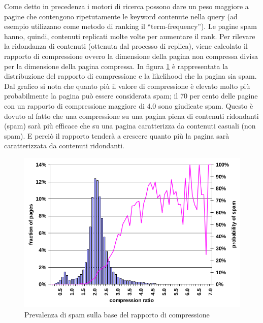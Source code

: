 Come detto in precedenza i  motori di ricerca possono dare un peso maggiore a pagine che contengono ripetutamente le keyword contenute nella query (ad esempio utilizzano come metodo di ranking il ``term-frequency''). Le pagine spam hanno, quindi,  contenuti replicati molte volte per aumentare il rank. Per rilevare la ridondanza di contenuti (ottenuta dal processo di replica), viene calcolato il rapporto di compressione ovvero la dimensione della pagina non compressa divisa per la dimensione della pagina compressa. In figura \ref{fig:fetterly8} è rappresentata la distribuzione del rapporto di compressione e la likelihood che la pagina sia spam. Dal grafico si nota che quanto più il valore di compressione è elevato molto più probabilmente la pagina può essere considerata spam; il 70 per cento delle pagine con un rapporto di compressione maggiore di 4.0 sono giudicate spam. Questo è dovuto al fatto che una compressione su una pagina piena di contenuti ridondanti (spam) sarà più efficace che su una pagina 
caratterizza da contenuti casuali (non spam). E perciò il rapporto tenderà a crescere quanto più la pagina sarà caratterizzata da contenuti ridondanti.
\begin{figure}[htbp]
\centering
\includegraphics[width=12cm]{immagini/fetterly/fetterly8}
\caption{Prevalenza di spam sulla base del rapporto di compressione}
\label{fig:fetterly8}
\end{figure}


